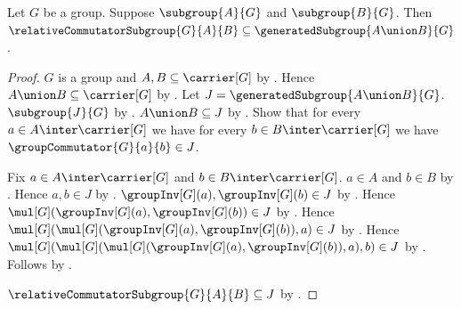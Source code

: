 \begin{theorem}\label{relative_commutator_subset_generated_join}
    Let $G$ be a group.
    Suppose $\subgroup{A}{G}$ and $\subgroup{B}{G}$.
    Then
        $\relativeCommutatorSubgroup{G}{A}{B}\subseteq
            \generatedSubgroup{A\union B}{G}$.
\end{theorem}
\begin{proof}
    $G$ is a group and $A,B\subseteq\carrier[G]$ by
        .
    Hence $A\union B\subseteq\carrier[G]$ by
        .
    Let $J=\generatedSubgroup{A\union B}{G}$.
    $\subgroup{J}{G}$ by .
    $A\union B\subseteq J$ by
        .
    Show that for every $a\in A\inter\carrier[G]$ we have for every
        $b\in B\inter\carrier[G]$ we have
        $\groupCommutator{G}{a}{b}\in J$.
    \begin{subproof}
        Fix $a\in A\inter\carrier[G]$ and
            $b\in B\inter\carrier[G]$.
        $a\in A$ and $b\in B$ by .
        Hence $a,b\in J$ by .
        $\groupInv[G](a),\groupInv[G](b)\in J$ by
            .
        Hence
            $\mul[G](\groupInv[G](a),\groupInv[G](b))\in J$ by
            .
        Hence
            $\mul[G](
                \mul[G](\groupInv[G](a),\groupInv[G](b)),a)\in J$ by
            .
        Hence
            $\mul[G](
                \mul[G](
                    \mul[G](\groupInv[G](a),\groupInv[G](b)),a),b)
                \in J$ by .
        Follows by .
    \end{subproof}
    $\relativeCommutatorSubgroup{G}{A}{B}\subseteq J$ by
        .
\end{proof}

